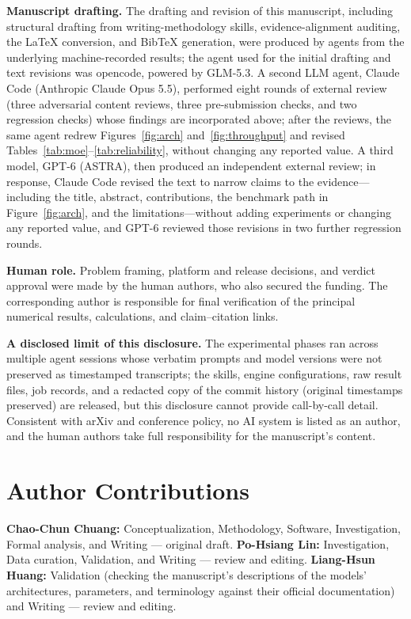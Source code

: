 \documentclass[11pt]{article}
\begin{document}
\textbf{Manuscript drafting.} The drafting and revision of this manuscript, including structural drafting from writing-methodology skills, evidence-alignment auditing, the LaTeX conversion, and BibTeX generation, were produced by agents from the underlying machine-recorded results; the agent used for the initial drafting and text revisions was opencode, powered by GLM-5.3. A second LLM agent, Claude Code (Anthropic Claude Opus 5.5), performed eight rounds of external review (three adversarial content reviews, three pre-submission checks, and two regression checks) whose findings are incorporated above; after the reviews, the same agent redrew Figures~\ref{fig:arch} and~\ref{fig:throughput} and revised Tables~\ref{tab:moe}--\ref{tab:reliability}, without changing any reported value. A third model, GPT-6 (ASTRA), then produced an independent external review; in response, Claude Code revised the text to narrow claims to the evidence---including the title, abstract, contributions, the benchmark path in Figure~\ref{fig:arch}, and the limitations---without adding experiments or changing any reported value, and GPT-6 reviewed those revisions in two further regression rounds.

\textbf{Human role.} Problem framing, platform and release decisions, and verdict approval were made by the human authors, who also secured the funding. The corresponding author is responsible for final verification of the principal numerical results, calculations, and claim--citation links.

\textbf{A disclosed limit of this disclosure.} The experimental phases ran across multiple agent sessions whose verbatim prompts and model versions were not preserved as timestamped transcripts; the skills, engine configurations, raw result files, job records, and a redacted copy of the commit history (original timestamps preserved) are released, but this disclosure cannot provide call-by-call detail. Consistent with arXiv and conference policy, no AI system is listed as an author, and the human authors take full responsibility for the manuscript's content.

\section*{Author Contributions}

\textbf{Chao-Chun Chuang:} Conceptualization, Methodology, Software, Investigation, Formal analysis, and Writing --- original draft. \textbf{Po-Hsiang Lin:} Investigation, Data curation, Validation, and Writing --- review and editing. \textbf{Liang-Hsun Huang:} Validation (checking the manuscript's descriptions of the models' architectures, parameters, and terminology against their official documentation) and Writing --- review and editing.
\end{document}
